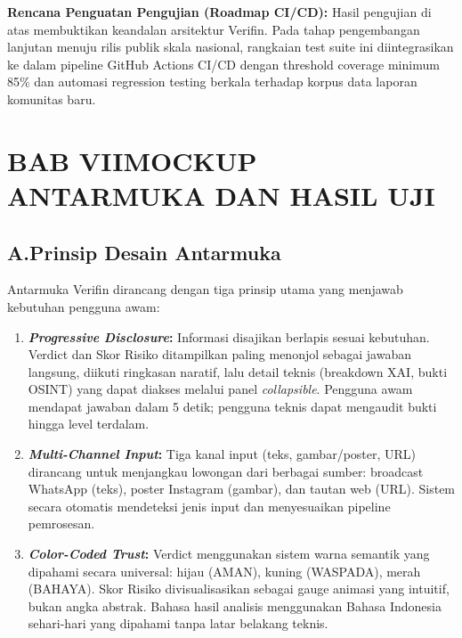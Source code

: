 \documentclass[12pt,a4paper]{article}
\begin{document}
\begin{blokkuning}
\textbf{Rencana Penguatan Pengujian (Roadmap CI/CD):} Hasil pengujian di atas membuktikan keandalan
arsitektur Verifin. Pada tahap pengembangan lanjutan menuju rilis publik skala nasional, rangkaian test suite
ini diintegrasikan ke dalam pipeline GitHub Actions CI/CD dengan threshold coverage minimum 85\% dan automasi
regression testing berkala terhadap korpus data laporan komunitas baru.

\end{blokkuning}

\section*{BAB VII\quad MOCKUP ANTARMUKA DAN HASIL UJI}

\subsection*{A.\quad Prinsip Desain Antarmuka}

Antarmuka Verifin dirancang dengan tiga prinsip utama yang menjawab kebutuhan pengguna awam:

\begin{enumerate}[label=\textbf{\arabic*.}]
\item \textbf{\textit{Progressive Disclosure}:} Informasi disajikan berlapis sesuai kebutuhan.
Verdict dan Skor Risiko ditampilkan paling menonjol sebagai jawaban langsung, diikuti ringkasan
naratif, lalu detail teknis (breakdown XAI, bukti OSINT) yang dapat diakses melalui panel
\textit{collapsible}. Pengguna awam mendapat jawaban dalam 5 detik; pengguna teknis dapat
mengaudit bukti hingga level terdalam.

\item \textbf{\textit{Multi-Channel Input}:} Tiga kanal input (teks, gambar/poster, URL) dirancang
untuk menjangkau lowongan dari berbagai sumber: broadcast WhatsApp (teks), poster Instagram
(gambar), dan tautan web (URL). Sistem secara otomatis mendeteksi jenis input dan menyesuaikan
pipeline pemrosesan.

\item \textbf{\textit{Color-Coded Trust}:} Verdict menggunakan sistem warna semantik yang
dipahami secara universal: hijau (AMAN), kuning (WASPADA), merah (BAHAYA). Skor Risiko
divisualisasikan sebagai gauge animasi yang intuitif, bukan angka abstrak. Bahasa hasil analisis
menggunakan Bahasa Indonesia sehari-hari yang dipahami tanpa latar belakang teknis.
\end{enumerate}
\end{document}
